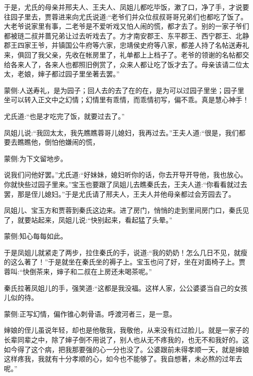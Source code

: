 \begin{parag}
    于是，尤氏的母亲并邢夫人、王夫人、凤姐儿都吃毕饭，漱了口，净了手，才说要往园子里去，贾蓉进来向尤氏说道:“老爷们并众位叔叔哥哥兄弟们也都吃了饭了。大老爷说家里有事，二老爷是不爱听戏又怕人闹的慌，都才去了。别的一家子爷们都被琏二叔并蔷兄弟让过去听戏去了。方才南安郡王、东平郡王、西宁郡王、北静郡王四家王爷，并镇国公牛府等六家，忠靖侯史府等八家，都差人持了名帖送寿礼来，俱回了我父亲，先收在帐房里了，礼单都上上档子了。老爷的领谢的名帖都交给各来人了，各来人也都照旧例赏了，众来人都让吃了饭才去了。母亲该请二位太太，老娘，婶子都过园子里坐著去罢。”\begin{note}蒙侧:人送寿礼，是为园子；回人去的去了在的在，是为可以过园子里坐；园子里坐可以转入正文中之幻情；幻情里有乖情，而乖情初写，偏不乖。真是慧心神手！\end{note}尤氏道:“也是才吃完了饭，就要过去了。”
\end{parag}


\begin{parag}
    凤姐儿说:“我回太太，我先瞧瞧蓉哥儿媳妇，我再过去。”王夫人道:“很是，我们都要去瞧瞧他，倒怕他嫌闹的慌，\begin{note}蒙侧:为下文留地步。\end{note}说我们问他好罢。”尤氏道:“好妹妹，媳妇听你的话，你去开导开导他，我也放心。你就快些过园子里来。”宝玉也要跟了凤姐儿去瞧秦氏去，王夫人道:“你看看就过去罢，那是侄儿媳妇。”于是尤氏请了邢夫人，王夫人并他母亲都过会芳园去了。
\end{parag}


\begin{parag}
    凤姐儿、宝玉方和贾蓉到秦氏这边来。进了房门，悄悄的走到里间房门口，秦氏见了，就要站起来，凤姐儿说:“快别起来，看起猛了头晕。”\begin{note}蒙侧:知心每每如此。\end{note}于是凤姐儿就紧走了两步，拉住秦氏的手，说道:“我的奶奶！怎么几日不见，就瘦的这么著了！”于是就坐在秦氏坐的褥子上。宝玉也问了好，坐在对面椅子上。贾蓉叫:“快倒茶来，婶子和二叔在上房还未喝茶呢。”
\end{parag}


\begin{parag}
    秦氏拉著凤姐儿的手，强笑道:“这都是我没福。这样人家，公公婆婆当自己的女孩儿似的待。\begin{note}蒙侧:正写幻情，偏作锥心刺骨语。呼渡河者三，是一意。\end{note}婶娘的侄儿虽说年轻，却也是他敬我，我敬他，从来没有红过脸儿。就是一家子的长辈同辈之中，除了婶子倒不用说了，别人也从无不疼我的，也无不和我好的。这如今得了这个病，把我那要强的心一分也没了。公婆跟前未得孝顺一天，就是婶娘这样疼我，我就有十分孝顺的心，如今也不能够了。我自想著，未必熬的过年去呢。”
\end{parag}


